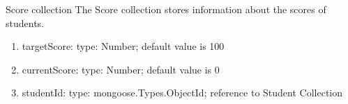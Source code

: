 \begin{frame}{Score collection}
The Score collection stores information about the scores of students.
\begin{enumerate}
    

\item targetScore: {type: Number}; default value is 100
\item currentScore: {type: Number}; default value is 0
\item studentId: {type: mongoose.Types.ObjectId}; reference to Student Collection
\end{enumerate}
\end{frame}
    
